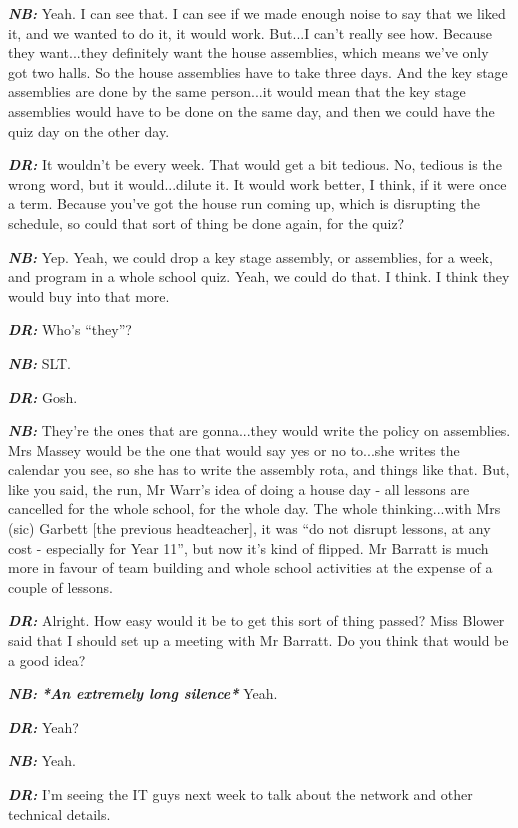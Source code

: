 \textit{\textbf{NB:}} Yeah. I can see that. I can see if we made enough noise to say that we liked it, and we wanted to do it, it would work. But...I can't really see how. Because they want...they definitely want the house assemblies, which means we've only got two halls. So the house assemblies have to take three days. And the key stage assemblies are done by the same person...it would mean that the key stage assemblies would have to be done on the same day, and then we could have the quiz day on the other day.

\textit{\textbf{DR:}} It wouldn't be every week. That would get a bit tedious. No, tedious is the wrong word, but it would...dilute it. It would work better, I think, if it were once a term. Because you've got the house run coming up, which is disrupting the schedule, so could that sort of thing be done again, for the quiz?

\textit{\textbf{NB:}} Yep. Yeah, we could drop a key stage assembly, or assemblies, for a week, and program in a whole school quiz. Yeah, we could do that. I think. I think they would buy into that more.

\textit{\textbf{DR:}} Who's ``they''?

\textit{\textbf{NB:}} SLT.

\textit{\textbf{DR:}} Gosh.

\textit{\textbf{NB:}} They're the ones that are gonna...they would write the policy on assemblies. Mrs Massey would be the one that would say yes or no to...she writes the calendar you see, so she has to write the assembly rota, and things like that. But, like you said, the run, Mr Warr's idea of doing a house day - all lessons are cancelled for the whole school, for the whole day. The whole thinking...with Mrs (sic) Garbett [the previous headteacher], it was ``do not disrupt lessons, at any cost - especially for Year 11'', but now it's kind of flipped. Mr Barratt is much more in favour of team building and whole school activities at the expense of a couple of lessons.  

\textit{\textbf{DR:}} Alright. How easy would it be to get this sort of thing passed? Miss Blower said that I should set up a meeting with Mr Barratt. Do you think that would be a good idea?

\textit{\textbf{NB:}} \textit{\textbf{*An extremely long silence*}} Yeah. 

\textit{\textbf{DR:}} Yeah?

\textit{\textbf{NB:}} Yeah.

\textit{\textbf{DR:}} I'm seeing the IT guys next week to talk about the network and other technical details.

